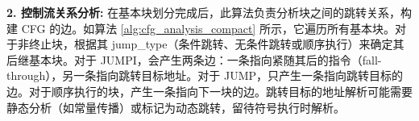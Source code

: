 \documentclass[print, master, vlined, timesmath]{DissertUESTC}
\begin{document}


\textbf{2. 控制流关系分析:}
在基本块划分完成后，此算法负责分析块之间的跳转关系，构建 CFG 的边。如算法 \ref{alg:cfg_analysis_compact} 所示，它遍历所有基本块。对于非终止块，根据其 jump\_type（条件跳转、无条件跳转或顺序执行）来确定其后继基本块。对于 JUMPI，会产生两条边：一条指向紧随其后的指令（fall-through），另一条指向跳转目标地址。对于 JUMP，只产生一条指向跳转目标的边。对于顺序执行的块，产生一条指向下一块的边。跳转目标的地址解析可能需要静态分析（如常量传播）或标记为动态跳转，留待符号执行时解析。
\end{document}
